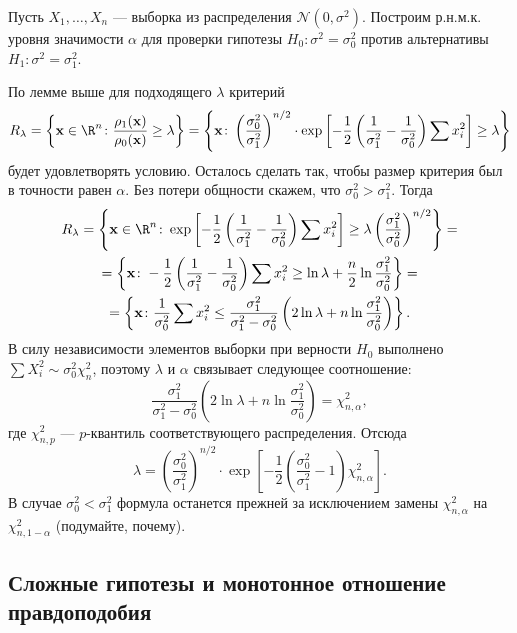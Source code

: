 \begin{example}
Пусть $X_1, \ldots, X_n$ --- выборка из распределения $\mathcal{N}(0, \sigma^2)$. Построим р.н.м.к. уровня значимости $\alpha$ для проверки гипотезы $H_0\colon \sigma^2 = \sigma^2_0$ против альтернативы $H_1\colon \sigma^2 = \sigma^2_1$.

По лемме выше для подходящего $\lambda$ критерий
\[
R_{\lambda} = \left\{\mathbf{x}\in\R^n\colon \frac{\rho_1(\mathbf{x})}{\rho_0(\mathbf{x})} \ge \lambda\right\} = \left\{\mathbf{x}\colon \left(\frac{\sigma^2_0}{\sigma^2_1}\right)^{n/2}\cdot \exp{\left[-\frac{1}{2}\left(\frac{1}{\sigma^2_1}-\frac{1}{\sigma^2_0}\right)\sum x_i^2\right]} \ge \lambda\right\}
\]
будет удовлетворять условию. Осталось сделать так, чтобы размер критерия был в точности равен $\alpha$. Без потери общности скажем, что $\sigma^2_0 > \sigma^2_1$. Тогда 
\begin{gather*}
    R_{\lambda} = \left\{\mathbf{x}\in\R^n\colon \exp{\left[-\frac{1}{2}\left(\frac{1}{\sigma^2_1}-\frac{1}{\sigma^2_0}\right)\sum x_i^2\right]} \ge \lambda\left(\frac{\sigma^2_1}{\sigma^2_0}\right)^{n/2}\right\} = \\
    = \left\{\mathbf{x}\colon -\frac{1}{2}\left(\frac{1}{\sigma^2_1}-\frac{1}{\sigma^2_0}\right)\sum x_i^2 \ge \ln{\lambda} + \frac{n}{2}\ln\frac{\sigma^2_1}{\sigma^2_0}\right\} = \\
    = \left\{\mathbf{x}\colon \frac{1}{\sigma^2_0}\sum x_i^2 \le \frac{\sigma^2_1}{\sigma_1^2 - \sigma^2_0}\left(2\ln{\lambda} + n\ln\frac{\sigma^2_1}{\sigma^2_0}\right)\right\}.
\end{gather*}
В силу независимости элементов выборки при верности $H_0$ выполнено $\sum X_i^2 \sim \sigma^2_0 \chi^2_n$, поэтому $\lambda$ и $\alpha$ связывает следующее соотношение:
\[
\frac{\sigma^2_1}{\sigma_1^2 - \sigma^2_0}\left(2\ln{\lambda} + n\ln\frac{\sigma^2_1}{\sigma^2_0}\right) = \chi^2_{n,\alpha},
\]
где $\chi^2_{n,p}$ --- $p$-квантиль соответствующего распределения. Отсюда
\[
\lambda = \left(\frac{\sigma^2_0}{\sigma^2_1}\right)^{n/2}\cdot \exp{\left[-\frac{1}{2}\left(\frac{\sigma^2_0}{\sigma^2_1}-1\right)\chi^2_{n,\alpha}\right]}.
\]
В случае $\sigma^2_0 < \sigma^2_1$ формула останется прежней за исключением замены $\chi^2_{n,\alpha}$ на $\chi^2_{n,1-\alpha}$ (подумайте, почему).
\end{example}

\subsection{Сложные гипотезы и монотонное отношение правдоподобия}


